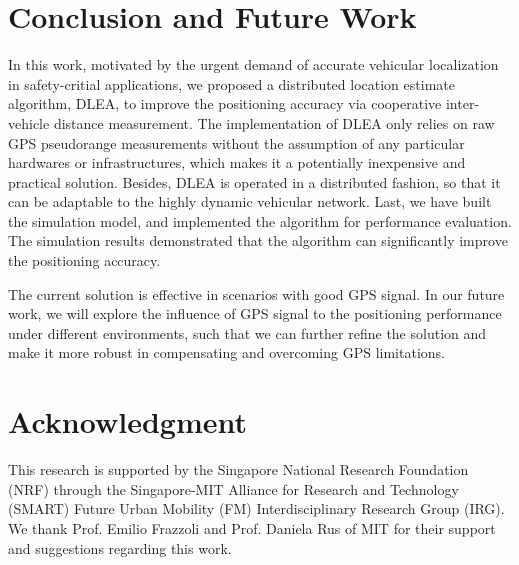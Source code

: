 \documentclass[letterpaper, 10 pt, conference]{ieeeconf}
\begin{document}
\section{Conclusion and Future Work}\label{con}
In this work, motivated by the urgent demand of accurate vehicular localization in safety-critial applications, we proposed a distributed location estimate algorithm, DLEA, to improve the positioning accuracy via cooperative inter-vehicle distance measurement. The implementation of DLEA only relies on  raw GPS pseudorange measurements without the assumption of any particular hardwares or infrastructures, which makes it a potentially inexpensive and practical solution. Besides, DLEA is operated in a distributed fashion, so that it can be adaptable to the highly dynamic vehicular network. Last, we have built the simulation model, and implemented the algorithm for performance evaluation. The simulation results demonstrated that the algorithm can significantly improve the positioning accuracy.


The current solution is effective in scenarios with good GPS signal. In our future work, we will  explore the influence of GPS signal to the positioning performance under different environments, such that we can further refine the solution and make it more robust in compensating and overcoming GPS limitations.

\section*{Acknowledgment}
This research is supported by the Singapore National Research Foundation (NRF) through the Singapore-MIT Alliance for Research and Technology (SMART) Future Urban Mobility (FM) Interdisciplinary Research Group (IRG). We thank Prof. Emilio Frazzoli and Prof. Daniela Rus of MIT for their support and suggestions regarding this work.


\end{document}

